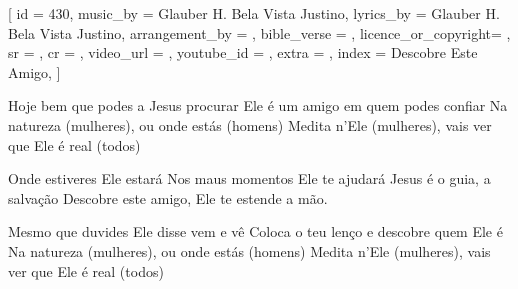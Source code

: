[
    id                  = {430},
    music_by            = {Glauber H. Bela Vista Justino}, %
    lyrics_by           = {Glauber H. Bela Vista Justino}, %
    arrangement_by      = {}, %
    bible_verse         = {},
    licence_or_copyright= {},
    sr                  = {},
    cr                  = {},
    video_url           = {}, %
    youtube_id          = {}, %
    extra               = {},
    index               = {Descobre Este Amigo},
]

\beginverse
Hoje bem que podes a Jesus procurar
Ele é um amigo em quem podes confiar
Na natureza (mulheres), ou onde estás (homens) 
Medita n’Ele (mulheres), vais ver que Ele é real (todos)
\endverse

\beginchorus
Onde estiveres Ele estará
Nos maus momentos Ele te ajudará
Jesus é o guia, a salvação
Descobre este amigo, Ele te estende a mão.
\endchorus

\beginverse
Mesmo que duvides Ele disse vem e vê
Coloca o teu lenço e descobre quem Ele é
Na natureza (mulheres), ou onde estás (homens) 
Medita n’Ele (mulheres), vais ver que Ele é real (todos)
\endverse

\endsong
